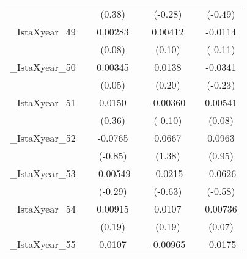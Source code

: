{\begin{tabular}{l*{6}{c}}
            &                     &      (0.38)         &                     &     (-0.28)         &                     &     (-0.49)         \\
[1em]
\_IstaXyear\_49&                     &     0.00283         &                     &     0.00412         &                     &     -0.0114         \\
            &                     &      (0.08)         &                     &      (0.10)         &                     &     (-0.11)         \\
[1em]
\_IstaXyear\_50&                     &     0.00345         &                     &      0.0138         &                     &     -0.0341         \\
            &                     &      (0.05)         &                     &      (0.20)         &                     &     (-0.23)         \\
[1em]
\_IstaXyear\_51&                     &      0.0150         &                     &    -0.00360         &                     &     0.00541         \\
            &                     &      (0.36)         &                     &     (-0.10)         &                     &      (0.08)         \\
[1em]
\_IstaXyear\_52&                     &     -0.0765         &                     &      0.0667         &                     &      0.0963         \\
            &                     &     (-0.85)         &                     &      (1.38)         &                     &      (0.95)         \\
[1em]
\_IstaXyear\_53&                     &    -0.00549         &                     &     -0.0215         &                     &     -0.0626         \\
            &                     &     (-0.29)         &                     &     (-0.63)         &                     &     (-0.58)         \\
[1em]
\_IstaXyear\_54&                     &     0.00915         &                     &      0.0107         &                     &     0.00736         \\
            &                     &      (0.19)         &                     &      (0.19)         &                     &      (0.07)         \\
[1em]
\_IstaXyear\_55&                     &      0.0107         &                     &    -0.00965         &                     &     -0.0175         \\

\end{tabular}}
